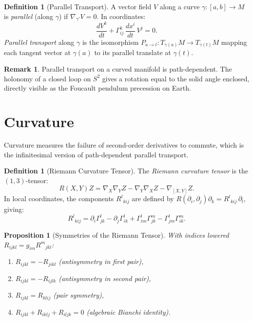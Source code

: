 \documentclass[12pt,a4paper]{amsart}
\newtheorem{proposition}[theorem]{Proposition}
\theoremstyle{definition}
\newtheorem{definition}[theorem]{Definition}
\newtheorem{remark}[theorem]{Remark}
\begin{document}
\begin{definition}[Parallel Transport]
A vector field $V$ along a curve $\gamma: [a,b] \to M$ is
\emph{parallel} (along $\gamma$) if $\nabla_{\gamma'}V = 0$.
In coordinates:
\[
  \frac{dV^k}{dt} + \Gamma^k_{ij}\,\frac{dx^i}{dt}\,V^j = 0.
\]
\emph{Parallel transport} along $\gamma$ is the isomorphism
$P_{a \to t}: T_{\gamma(a)}M \to T_{\gamma(t)}M$ mapping each tangent
vector at $\gamma(a)$ to its parallel translate at $\gamma(t)$.
\end{definition}

\begin{remark}
Parallel transport on a curved manifold is path-dependent. The holonomy of a
closed loop on $S^2$ gives a rotation equal to the solid angle enclosed,
directly visible as the Foucault pendulum precession on Earth.
\end{remark}

\section{Curvature}
\label{sec:curvature}

Curvature measures the failure of second-order derivatives to commute,
which is the infinitesimal version of path-dependent parallel transport.

\begin{definition}[Riemann Curvature Tensor]
The \emph{Riemann curvature tensor} is the $(1,3)$-tensor:
\[
  R(X,Y)Z = \nabla_X \nabla_Y Z - \nabla_Y \nabla_X Z - \nabla_{[X,Y]} Z.
\]
In local coordinates, the components $R^l{}_{\!kij}$ are defined by
$R(\partial_i, \partial_j)\partial_k = R^l{}_{\!kij}\,\partial_l$, giving:
\[
  R^l{}_{\!kij} = \partial_i \Gamma^l_{jk} - \partial_j \Gamma^l_{ik}
  + \Gamma^l_{im}\Gamma^m_{jk} - \Gamma^l_{jm}\Gamma^m_{ik}.
\]
\end{definition}

\begin{proposition}[Symmetries of the Riemann Tensor]
With indices lowered $R_{ijkl} = g_{im}R^m{}_{\!jkl}$:
\begin{enumerate}[label=(\roman*)]
  \item $R_{ijkl} = -R_{jikl}$ (antisymmetry in first pair),
  \item $R_{ijkl} = -R_{ijlk}$ (antisymmetry in second pair),
  \item $R_{ijkl} = R_{klij}$ (pair symmetry),
  \item $R_{ijkl} + R_{iklj} + R_{iljk} = 0$ (algebraic Bianchi identity).
\end{enumerate}
\end{proposition}
\end{document}
